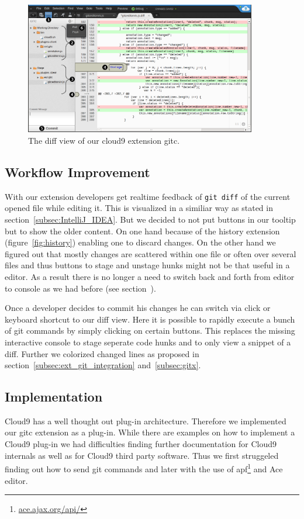 \begin{figure}
   \centering
   \includegraphics[width=0.9\textwidth]{images/extension_unstage.png}
   \caption{The diff view of our cloud9 extension gitc.}
   \label{fig:diff_view}
\end{figure}

\subsection{Workflow Improvement}
With our extension developers get realtime feedback of \texttt{git diff} of the current opened file while editing it.
This is visualized in a similiar way as stated in section~\ref{subsec:IntelliJ_IDEA}.
But we decided to not put buttons in our tooltip but to show the older content.
On one hand because of the history extension (figure~\ref{fig:history}) enabling one to discard changes.
On the other hand we figured out that mostly changes are scattered within one file or often over several files and thus buttons to stage and unstage hunks might not be that useful in a editor.
As a result there is no longer a need to switch back and forth from editor to console as we had before (see section~).

Once a developer decides to commit his changes he can switch via click or keyboard shortcut to our diff view.
Here it is possible to rapidly execute a bunch of git commands by simply clicking on certain buttons.
This replaces the missing interactive console to stage seperate code hunks and to only view a snippet of a diff.
Further we colorized changed lines as proposed in section~\ref{subsec:ext_git_integration} and~\ref{subsec:gitx}.

\subsection{Implementation}
Cloud9 has a well thought out plug-in architecture.
Therefore we implemented our gitc extension as a plug-in.
While there are examples on how to implement a Cloud9 plug-in we had difficulties finding further documentation for Cloud9 internals as well as for Cloud9 third party software.
Thus we first struggeled finding out how to send git commands and later with the use of apf\footnote{\url{ace.ajax.org/api/}} and Ace editor.

